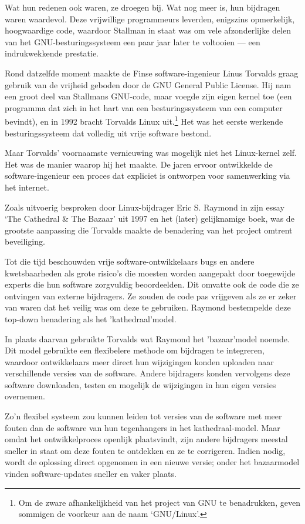 \documentclass[
  a5paper,
  smalldemyvopaper,11pt,twoside,onecolumn,openright,extrafontsizes]{memoir}
\begin{document}
Wat hun redenen ook waren, ze droegen bij. Wat nog meer is, hun
bijdragen waren waardevol. Deze vrijwillige programmeurs leverden,
enigszins opmerkelijk, hoogwaardige code, waardoor Stallman in staat was
om vele afzonderlijke delen van het GNU-besturingssysteem een paar jaar
later te voltooien --- een indrukwekkende prestatie.

Rond datzelfde moment maakte de Finse software-ingenieur Linus Torvalds
graag gebruik van de vrijheid geboden door de GNU General Public
License. Hij nam een groot deel van Stallmans GNU-code, maar voegde zijn
eigen kernel toe (een programma dat zich in het hart van een
besturingssysteem van een computer bevindt), en in 1992 bracht Torvalds
Linux uit.\footnote{Om de zware afhankelijkheid van het project van GNU
  te benadrukken, geven sommigen de voorkeur aan de naam `GNU/Linux'.}
Het was het eerste werkende besturingssysteem dat volledig uit vrije
software bestond.

Maar Torvalds' voornaamste vernieuwing was mogelijk niet het
Linux-kernel zelf. Het was de manier waarop hij het maakte. De jaren
ervoor ontwikkelde de software-ingenieur een proces dat expliciet is
ontworpen voor samenwerking via het internet.

Zoals uitvoerig besproken door Linux-bijdrager Eric S. Raymond in zijn
essay `The Cathedral \& The Bazaar' uit 1997 en het (later) gelijknamige
boek, was de grootste aanpassing die Torvalds maakte de benadering van
het project omtrent beveiliging.

Tot die tijd beschouwden vrije software-ontwikkelaars bugs en andere
kwetsbaarheden als grote risico's die moesten worden aangepakt door
toegewijde experts die hun software zorgvuldig beoordeelden. Dit omvatte
ook de code die ze ontvingen van externe bijdragers. Ze zouden de code
pas vrijgeven als ze er zeker van waren dat het veilig was om deze te
gebruiken. Raymond bestempelde deze top-down benadering als het
'kathedraal'model.

In plaats daarvan gebruikte Torvalds wat Raymond het 'bazaar'model
noemde. Dit model gebruikte een flexibelere methode om bijdragen te
integreren, waardoor ontwikkelaars meer direct hun wijzigingen konden
uploaden naar verschillende versies van de software. Andere bijdragers
konden vervolgens deze software downloaden, testen en mogelijk de
wijzigingen in hun eigen versies overnemen.

Zo'n flexibel systeem zou kunnen leiden tot versies van de software met
meer fouten dan de software van hun tegenhangers in het
kathedraal-model. Maar omdat het ontwikkelproces openlijk plaatsvindt,
zijn andere bijdragers meestal sneller in staat om deze fouten te
ontdekken en ze te corrigeren. Indien nodig, wordt de oplossing direct
opgenomen in een nieuwe versie; onder het bazaarmodel vinden
software-updates sneller en vaker plaats.
\end{document}
